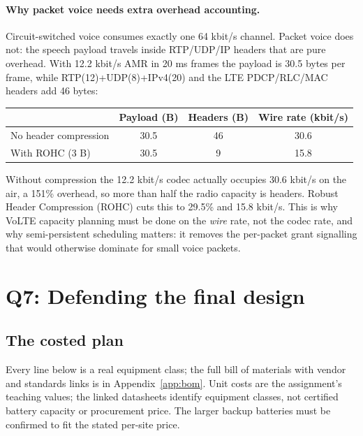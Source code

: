 \documentclass[9pt,a4paper]{extarticle}
\begin{document}
\paragraph{Why packet voice needs extra overhead accounting.} Circuit-switched voice consumes
exactly one 64 kbit/s channel. Packet voice does not: the speech payload travels inside
RTP/UDP/IP headers that are pure overhead. With 12.2 kbit/s AMR in 20 ms frames the payload is
30.5 bytes per frame, while RTP(12)+UDP(8)+IPv4(20) and the LTE PDCP/RLC/MAC headers add 46
bytes:

\begin{center}\small
\begin{tabular}{@{}lccc@{}}
\toprule
& Payload (B) & Headers (B) & Wire rate (kbit/s) \\
\midrule
No header compression & 30.5 & 46 & 30.6 \\
With ROHC (3 B) & 30.5 & 9 & 15.8 \\
\bottomrule
\end{tabular}
\end{center}

Without compression the 12.2 kbit/s codec actually occupies 30.6 kbit/s on the air, a 151\%
overhead, so more than half the radio capacity is headers. Robust Header Compression (ROHC) cuts
this to 29.5\% and 15.8 kbit/s. This is why VoLTE capacity planning must be done on the \emph{wire}
rate, not the codec rate, and why semi-persistent scheduling matters: it removes the per-packet
grant signalling that would otherwise dominate for small voice packets.

\section{Q7: Defending the final design}
\label{sec:q7}

\subsection{The costed plan}
Every line below is a real equipment class; the full bill of materials with vendor and standards
links is in Appendix~\ref{app:bom}. Unit costs are the assignment's teaching values; the linked
datasheets identify equipment classes, not certified battery capacity or procurement price.
The larger backup batteries must be confirmed to fit the stated per-site price.
\end{document}
